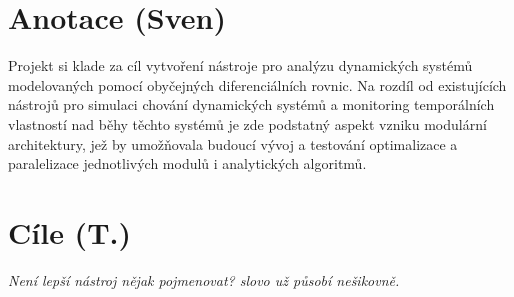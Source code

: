 \documentclass[a4paper]{article}
\begin{document}
\doublespacing

\section{Anotace (Sven)}
Projekt si klade za cíl vytvoření nástroje pro analýzu dynamických systémů modelovaných pomocí obyčejných diferenciálních rovnic. Na rozdíl od existujících
nástrojů pro simulaci chování dynamických systémů a monitoring temporálních vlastností nad běhy těchto systémů je zde podstatný aspekt vzniku modulární
architektury, jež by umožňovala budoucí vývoj a testování optimalizace a paralelizace jednotlivých modulů i analytických algoritmů.

\section{Cíle (T.)}
\textit{Není lepší nástroj nějak pojmenovat? slovo  už působí nešikovně.}
\end{document}
